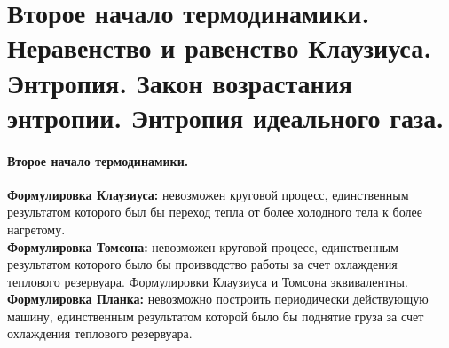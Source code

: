 \section{\normalsize  Второе начало термодинамики. Неравенство и равенство Клаузиуса. Энтропия. Закон возрастания энтропии. Энтропия идеального газа.}
\paragraph{Второе начало термодинамики.} \textbf{Формулировка Клаузиуса:} невозможен круговой процесс, единственным результатом которого был бы переход тепла от более холодного тела к более нагретому.\\
\textbf{Формулировка Томсона:} невозможен круговой процесс, единственным результатом которого было бы производство работы за счет охлаждения теплового резервуара. Формулировки Клаузиуса и Томсона эквивалентны. \\
\textbf{Формулировка Планка:} невозможно построить периодически действующую машину, единственным результатом которой было бы поднятие груза за счет охлаждения теплового резервуара.
